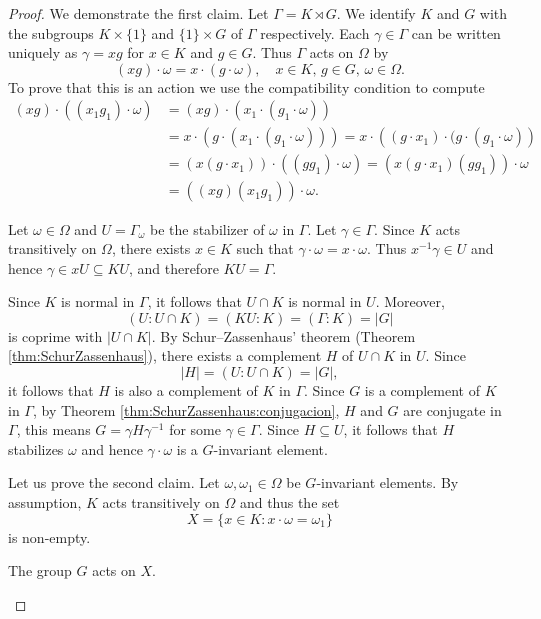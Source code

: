 \begin{proof}
	We demonstrate the first claim. 
	Let $\Gamma=K\rtimes G$. We identify $K$ and $G$ with the subgroups $K\times \{1\}$ and $\{1\}\times G$ of $\Gamma$ respectively.   Each $\gamma\in\Gamma$ can be written uniquely as $\gamma=xg$ for
	$x\in K$ and $g\in G$. Thus $\Gamma$ acts on $\Omega$ by
	\[
	(xg)\cdot \omega=x\cdot (g\cdot \omega),\quad x\in K,\,g\in G,\,\omega\in\Omega.
	\]
	To prove that this is an action we use the compatibility condition to compute
	\begin{align*}
	(xg)\cdot ((x_1g_1)\cdot\omega) &= (xg)\cdot \left(x_1\cdot (g_1\cdot\omega)\right)\\
	&=x\cdot \left(g\cdot (x_1\cdot (g_1\cdot\omega))\right)
	=x\cdot \left((g\cdot x_1)\cdot (g\cdot (g_1\cdot\omega)\right)\\
	&=(x(g\cdot x_1))\cdot ((gg_1)\cdot \omega)
	=(x(g\cdot x_1)(gg_1))\cdot\omega\\
	&=((xg)(x_1g_1))\cdot \omega.	
	\end{align*}
	
	Let $\omega\in\Omega$ and $U=\Gamma_\omega$ be the stabilizer of $\omega$ in $\Gamma$. Let $\gamma\in\Gamma$. Since
	$K$ acts transitively on $\Omega$, there exists $x\in K$ such that 
	$\gamma\cdot\omega=x\cdot\omega$. Thus $x^{-1}\gamma\in U$ and
	hence 
	$\gamma\in x U\subseteq KU$, and therefore $KU=\Gamma$. 
	
	Since $K$ is normal in $\Gamma$, it follows that 
	$U\cap K$ is normal in $U$. Moreover, 
	\[
	(U:U\cap K)=(KU:K)=(\Gamma:K)=|G|
	\]
	is coprime with $|U\cap K|$. By Schur--Zassenhaus' theorem (Theorem \ref{thm:SchurZassenhaus}), there exists a complement 
	$H$ of $U\cap K$ in $U$. Since 
	\[
	|H|=(U:U\cap K)=|G|,
	\]
	it follows that $H$ is also a complement of $K$ in $\Gamma$. Since $G$ is a complement of $K$ in $\Gamma$, 
	by Theorem \ref{thm:SchurZassenhaus:conjugacion}, $H$ and $G$ are conjugate in $\Gamma$, this means 
	$G=\gamma H\gamma^{-1}$ for some  $\gamma\in\Gamma$. Since $H\subseteq U$, it follows that $H$ stabilizes $\omega$ and
	hence  $\gamma\cdot\omega$ is a $G$-invariant element. 
	
	Let us prove the second claim. 
	Let $\omega,\omega_1\in\Omega$ be $G$-invariant elements. 
	By assumption, $K$ acts transitively on $\Omega$ and thus 
	the set
	\[
	X=\{x\in K:x\cdot \omega=\omega_1\}
	\]
	is non-empty. 
	
	\begin{claim}
		The group $G$ acts on $X$. 
	\end{claim}


\end{proof}
